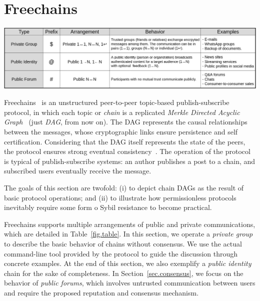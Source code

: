 \documentclass[10pt,journal,compsoc]{IEEEtran}
\newcommand{\FC}       {Freechains\xspace}
\begin{document}

\section{\FC}
\label{sec.freechains}

\begin{table}
\centering
\includegraphics[width=\textwidth]{arrangements.png}
\caption{The three types of chains and arrangements in \FC.}
\label{fig.table}
\end{table}

\FC~\cite{fcs.sbseg20} is an unstructured peer-to-peer topic-based
publish-subscribe protocol, in which each topic or \emph{chain} is a replicated
\emph{Merkle Directed Acyclic Graph}~\cite{p2p.ipfs} (just \emph{DAG}, from now
on).
The DAG represents the causal relationships between the messages, whose
cryptographic links ensure persistence and self certification.
Considering that the DAG itself represents the state of the peers, the protocol
ensures strong eventual consistency~\cite{fed.matrix,p2p.byz}.
%
The operation of the protocol is typical of publish-subscribe systems: an
author publishes a post to a chain, and subscribed users eventually receive the
message.

The goals of this section are twofold:
    (i)  to depict chain DAGs as the result of basic protocol operations; and
    (ii) to illustrate how permissionless protocols inevitably require some
         form o Sybil resistance to become practical.

\FC supports multiple arrangements of public and private communications, which
are detailed in Table~\ref{fig.table}.
In this section, we operate a \emph{private group} to describe the basic
behavior of chains without consensus.
We use the actual command-line tool provided by the protocol to guide the
discussion through concrete examples.
At the end of this section, we also exemplify a \emph{public identity} chain
for the sake of completeness.
In Section~\ref{sec.consensus}, we focus on the behavior of \emph{public
forums}, which involves untrusted communication between users and require the
proposed reputation and consensus mechanism.
\end{document}
